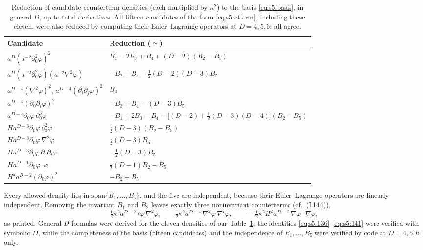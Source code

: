 \documentclass[aps,prd,onecolumn,10pt,nofootinbib,floatfix]{revtex4-2}
\newcommand{\eqI}[1]{(I.#1)}
\begin{document}
\begin{table}[tb]
\caption{Reduction of candidate counterterm densities (each multiplied by $\kappa^2$) to the basis \eqref{eq:s5:basis}, in general $D$, up to total derivatives. All fifteen candidates of the form \eqref{eq:s5:ctform}, including these eleven, were also reduced by computing their Euler--Lagrange operators at $D=4,5,6$; all agree.}
\label{tab:s5:reductions}
\renewcommand{\arraystretch}{1.25}
\begin{ruledtabular}
\begin{tabular}{ll}
Candidate & Reduction ($\simeq$)\\
\hline
$a^D(a^{-2}\partial_0^2\varphi)^2$ & $B_1-2B_3+B_4+(D-2)(B_2-B_5)$\\
$a^D(a^{-2}\partial_0^2\varphi)(a^{-2}\nabla^2\varphi)$ & $-B_3+B_4-\tfrac12(D-2)(D-3)B_5$\\
$a^{D-4}(\nabla^2\varphi)^2$, $a^{D-4}(\partial_i\partial_j\varphi)^2$ & $B_4$\\
$a^{D-4}(\partial_0\partial_i\varphi)^2$ & $-B_3+B_4-(D-3)B_5$\\
$a^{D-4}\partial_0\varphi\,\partial_0^3\varphi$ & $-B_1+2B_3-B_4-\big[(D-2)+\tfrac12(D-3)(D-4)\big](B_2-B_5)$\\
$Ha^{D-3}\partial_0\varphi\,\partial_0^2\varphi$ & $\tfrac12(D-3)(B_2-B_5)$\\
$Ha^{D-3}\partial_0\varphi\,\nabla^2\varphi$ & $\tfrac12(D-3)B_5$\\
$Ha^{D-3}\partial_i\varphi\,\partial_0\partial_i\varphi$ & $-\tfrac12(D-3)B_5$\\
$Ha^{D-1}\partial_0\varphi\,\square\varphi$ & $\tfrac12(D-1)B_2-B_5$\\
$H^2a^{D-2}(\partial_0\varphi)^2$ & $-B_2+B_5$\\
\end{tabular}
\end{ruledtabular}
\end{table}

Every allowed density lies in $\mathrm{span}\{B_1,\dots,B_5\}$, and the five are independent, because their Euler--Lagrange operators are linearly independent.
Removing the invariant $B_1$ and $B_2$ leaves exactly three noninvariant counterterms (cf.\ \eqI{144}),
\begin{equation}
\tfrac12\kappa^2a^{D-2}\,\square\varphi\,\nabla^2\varphi,\qquad
\tfrac12\kappa^2a^{D-4}\,\nabla^2\varphi\,\nabla^2\varphi,\qquad
-\tfrac12\kappa^2H^2a^{D-2}\,\nabla\varphi\cdot\nabla\varphi ,
\label{eq:s5:144}
\end{equation}
as printed.
General-$D$ formulas were derived for the eleven densities of our Table~\ref{tab:s5:reductions}; the identities \eqref{eq:s5:136}--\eqref{eq:s5:141} were verified with symbolic $D$, while the completeness of the basis (fifteen candidates) and the independence of $B_1,\dots,B_5$ were verified by code at $D=4,5,6$ only.
\end{document}
